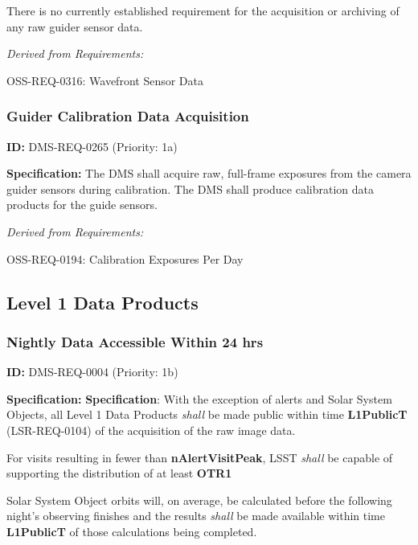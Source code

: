 \documentclass[SE,toc,lsstdraft]{lsstdoc}
\begin{document}
There is no currently established requirement for the acquisition or archiving of any raw guider sensor data.

\emph{Derived from Requirements:}

OSS-REQ-0316:
Wavefront Sensor Data \newline

\subsubsection{Guider Calibration Data Acquisition}

\label{DMS-REQ-0265}
\textbf{ID:} DMS-REQ-0265 (Priority: 1a)

\textbf{Specification:} The DMS shall acquire raw, full-frame exposures from the camera guider sensors during calibration. The DMS shall produce calibration data products for the guide sensors.

\emph{Derived from Requirements:}

OSS-REQ-0194:
Calibration Exposures Per Day \newline

\subsection{Level 1 Data Products}

\subsubsection{Nightly Data Accessible Within 24 hrs}

\label{DMS-REQ-0004}
\textbf{ID:} DMS-REQ-0004 (Priority: 1b)

\textbf{Specification:}
\textbf{Specification}: With the exception of alerts and Solar System Objects, all Level 1 Data Products \textit{shall} be made public within time \textbf{L1PublicT} (LSR-REQ-0104) of the acquisition of the raw image data.

For visits resulting in fewer than \textbf{nAlertVisitPeak}, LSST \textit{shall} be capable of supporting the distribution of at least \textbf{OTR1} %

Solar System Object orbits will, on average, be calculated before the following night's observing finishes and the results \textit{shall} be made available within time \textbf{L1PublicT} of those calculations being completed.
\end{document}
